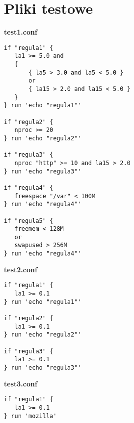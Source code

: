 \section{Pliki testowe}

\label{pliki}

\textbf{test1.conf}

{\scriptsize \begin{verbatim}
if "regula1" {
   la1 >= 5.0 and
   {
       { la5 > 3.0 and la5 < 5.0 }
       or
       { la15 > 2.0 and la15 < 5.0 }
   }
} run 'echo "regula1"'

if "regula2" {
   nproc >= 20
} run 'echo "regula2"'

if "regula3" {
   nproc "http" >= 10 and la15 > 2.0
} run 'echo "regula3"'

if "regula4" {
   freespace "/var" < 100M
} run 'echo "regula4"'

if "regula5" {
   freemem < 128M
   or
   swapused > 256M
} run 'echo "regula4"'
\end{verbatim} }

\textbf{test2.conf}

{\scriptsize \begin{verbatim}
if "regula1" {
   la1 >= 0.1
} run 'echo "regula1"'

if "regula2" {
   la1 >= 0.1
} run 'echo "regula2"'

if "regula3" {
   la1 >= 0.1
} run 'echo "regula3"'

\end{verbatim} }

\textbf{test3.conf}

{\scriptsize \begin{verbatim}
if "regula1" {
   la1 >= 0.1
} run 'mozilla'
\end{verbatim} }
